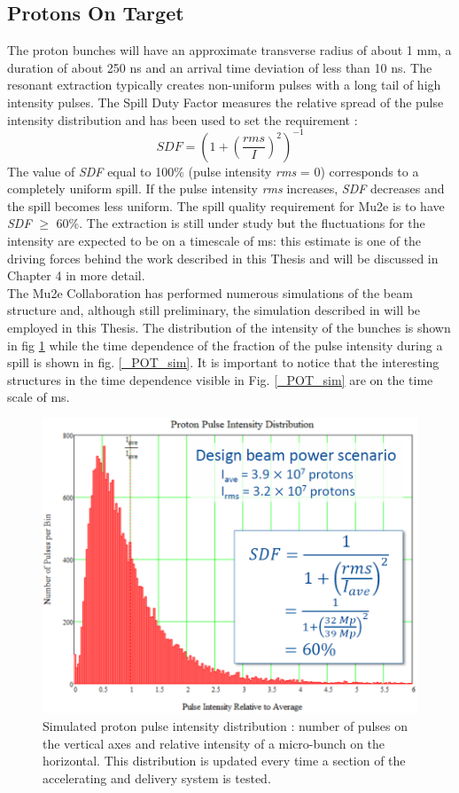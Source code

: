 \documentclass[12pt,a4paper,openright, oneside, titlepage]{book} %
\begin{document}
\subsection{Protons On Target}
The proton bunches will have an approximate transverse radius of about 1 mm, a duration of about 250 ns and an arrival time deviation of less than 10 ns.
The resonant extraction typically creates non-uniform pulses with a long tail of high intensity pulses. 
The Spill Duty Factor measures the relative spread of the pulse intensity distribution and has been used to set the requirement \cite{BeamRequirements}:
$$SDF=\left(1+\left(\frac{rms}{I}\right)^2\right)^{-1}$$
The value of {\em SDF} equal to 100\% (pulse intensity {\em rms} = 0) corresponds to a completely uniform spill. 
If the pulse intensity {\em rms} increases, {\em SDF} decreases and the spill becomes less uniform.
The spill quality requirement for Mu2e is to have {\em SDF} $\geqslant$  60\%.
The extraction is still under study but the fluctuations for the intensity are expected to be on a timescale of ms: 
this estimate is one of the driving forces behind the work described in this Thesis and will be discussed 
in Chapter 4 in more detail.\\
The Mu2e Collaboration has performed numerous simulations of the beam structure and, 
although still preliminary, the simulation described in \cite{SpillSim} will be employed in this Thesis. 
The distribution of the intensity of the bunches is shown in fig \ref{_POT_distribution} 
while the time dependence of the fraction of the pulse intensity during a spill is shown in fig. \ref{_POT_sim}. 
It is important to notice that the interesting structures in the time dependence 
visible in Fig. \ref{_POT_sim} are on the time scale of ms.
\label{_Fluctuations}

\begin{figure}[h!]
\centering
\includegraphics[scale=0.7]{POT_distribution}
\caption{Simulated proton pulse intensity distribution \cite{SpillSim}: 
number of pulses on the vertical axes and relative intensity of a micro-bunch on the horizontal. 
This distribution is updated every time a section of the accelerating and delivery system is tested.}
\label{_POT_distribution}
\end{figure}
\end{document}
